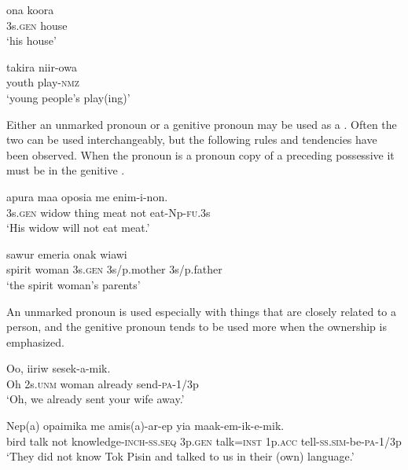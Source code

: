 \ea%
\label{ex:4:x406}
\gll ona  koora \\
    3s.\textsc{gen}  house  \\
\glt`his house'
\z

\ea%
\label{ex:4:x407}
\gll takira  niir-owa \\
  youth  play-\textsc{nmz}    \\
\glt`young  people's play(ing)'
\z

Either an unmarked pronoun or a genitive pronoun may be used as a . Often the two can be used interchangeably, but the following rules and tendencies have been observed. When the pronoun is a pronoun copy of a preceding possessive  it must be in the genitive . 

\ea%
\label{ex:4:x409}
\gll {}  apura  maa  oposia  me  enim-i-non. \\
  3s.\textsc{gen}  widow  thing  meat  not  eat-Np-\textsc{fu}.3s    \\
\glt`His widow will not eat meat.'
\z

\ea%
\label{ex:4:x410}
\gll sawur  emeria    onak  wiawi \\
    spirit  woman  3s.\textsc{gen}  3s/p.mother  3s/p.father  \\
\glt`the spirit woman's parents'
\z

An unmarked pronoun is used especially with things that are closely related to a person, and the genitive pronoun tends to be used more when the ownership is emphasized. 

\ea%
\label{ex:4:x1315}
\gll Oo,     iiriw  sesek-a-mik. \\
   Oh  2s.\textsc{unm}  woman  already  send-\textsc{pa}-1/3p   \\
\glt`Oh, we already sent your wife away.'
\z

\ea%
\label{ex:4:x1314}
\gll Nep(a)  opaimika  me  amis(a)-ar-ep     yia  maak-em-ik-e-mik.\\
    bird  talk  not  knowledge-\textsc{inch}-\textsc{ss}.\textsc{seq}  3p.\textsc{gen}  talk=\textsc{inst}  1p.\textsc{acc}  tell-\textsc{ss}.\textsc{sim}-be-\textsc{pa}-1/3p\\
\glt`They did not know Tok Pisin and talked to us in their (own) language.'
\z

